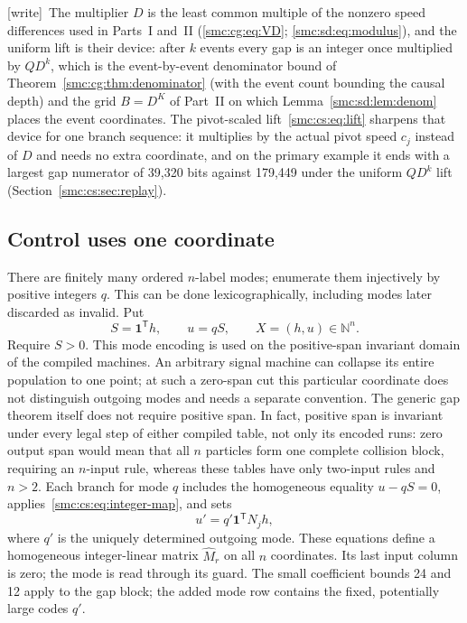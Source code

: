 \documentclass[11pt,letterpaper]{article}
\numberwithin{equation}{section}
\theoremstyle{definition}
\theoremstyle{remark}
\newcommand{\NN}{\mathbb N}
\newcommand{\wtag}{\textup{[write]}}
\newcommand{\one}{\mathbf 1}\newcommand{\set}[1]{\{#1\}}
\begin{document}
\wtag\ The multiplier $D$ is the least common multiple of the nonzero speed differences used in Parts~I and~II (\eqref{smc:cg:eq:VD}; \eqref{smc:sd:eq:modulus}), and the uniform lift is their device: after $k$ events every gap is an integer once multiplied by $QD^k$, which is the event-by-event denominator bound of Theorem~\ref{smc:cg:thm:denominator} (with the event count bounding the causal depth) and the grid $B=D^K$ of Part~II on which Lemma~\ref{smc:sd:lem:denom} places the event coordinates. The pivot-scaled lift~\eqref{smc:cs:eq:lift} sharpens that device for one branch sequence: it multiplies by the actual pivot speed $c_j$ instead of $D$ and needs no extra coordinate, and on the primary example it ends with a largest gap numerator of 39,320 bits against 179,449 under the uniform $QD^k$ lift (Section~\ref{smc:cs:sec:replay}).

\subsection{Control uses one coordinate}
There are finitely many ordered $n$-label modes; enumerate them injectively by positive integers $q$. This can be done lexicographically, including modes later discarded as invalid. Put
\begin{equation}\label{smc:cs:eq:mode}
 S=\one^{\mathsf T}h,\qquad u=qS,\qquad X=(h,u)\in\NN^n.
\end{equation}
Require $S>0$. This mode encoding is used on the positive-span invariant domain of the compiled machines. An arbitrary signal machine can collapse its entire population to one point; at such a zero-span cut this particular coordinate does not distinguish outgoing modes and needs a separate convention. The generic gap theorem itself does not require positive span. In fact, positive span is invariant under every legal step of either compiled table, not only its encoded runs: zero output span would mean that all $n$ particles form one complete collision block, requiring an $n$-input rule, whereas these tables have only two-input rules and $n>2$. Each branch for mode $q$ includes the homogeneous equality $u-qS=0$, applies~\eqref{smc:cs:eq:integer-map}, and sets
\begin{equation}\label{smc:cs:eq:control-update}
 u'=q'\one^{\mathsf T}N_jh,
\end{equation}
where $q'$ is the uniquely determined outgoing mode. These equations define a homogeneous integer-linear matrix $\widehat M_r$ on all $n$ coordinates. Its last input column is zero; the mode is read through its guard. The small coefficient bounds 24 and 12 apply to the gap block; the added mode row contains the fixed, potentially large codes $q'$.
\end{document}
